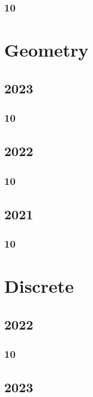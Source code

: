 \documentclass[11pt]{book}
\begin{document}
\subsection{10}

\chapter{Geometry}
\section{2023}
\subsection{10}


\section{2022}
\subsection{10}


\section{2021}
\subsection{10}


%
%
%

\chapter{Discrete}
\section{2022}
\subsection{10}

\section{2023}
\end{document}
